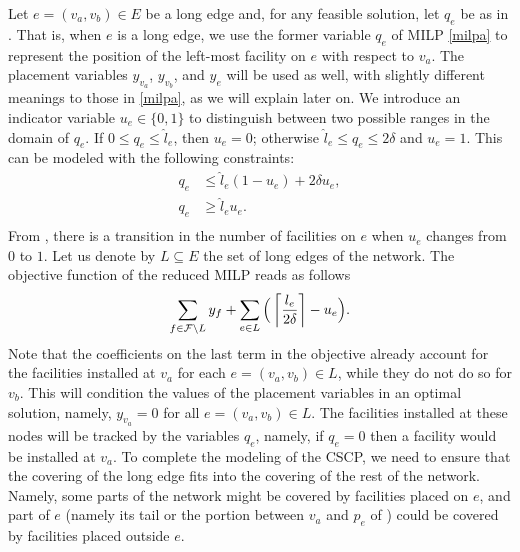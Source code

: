 Let $e=(v_a,v_b)\in E$ be a long edge and, for any feasible solution, let $q_e$ be as in . That is, when $e$ is a long edge, we use the former variable $q_e$ of MILP \eqref{milpa} to represent the position of the left-most facility on $e$ with respect to $v_a$. The placement variables $y_{v_a}$, $y_{v_b}$, and $y_e$ will be used as well, with slightly different meanings to those in \eqref{milpa}, as we will explain later on. We introduce an indicator variable $u_{e}\in\{0,1\}$ to distinguish between two possible ranges in the domain of $q_e$.  If $0 \le q_{e} \le \hat l_e$, then $u_{e} =0$; otherwise $\hat l_{e} \le q_{e} \le 2\delta$ and $u_{e} =1$.  This can be modeled with the following constraints:
\begin{equation}
\label{eq.cvu}
\begin{split}
	q_{e} &\le \hat l_e (1-u_{e})   +2\delta u_{e},\\
	q_{e} &\ge \hat l_e u_{e}. \\
\end{split}
\end{equation}
From ,  there is a  transition in the number of facilities on $e$ when $u_{e}$ changes from $0$ to $1$. Let us denote by $L\subseteq E$ the set of long edges of the network. The objective function of the reduced MILP reads as follows
\begin{equation}\label{obj-new}
	\sum_{f\in\mathcal F\setminus L} y_f + \sum_{e\in L} \Big(\left\lceil \frac{l_e}{2\delta}\right\rceil -u_e\Big).
\end{equation}
Note that the coefficients on the last term in the objective already account for the facilities installed at $v_a$ for each $e=(v_a,v_b)\in L$, while they do not do so for $v_b$. This will condition the values of the placement variables in an optimal solution, namely, $y_{v_a}=0$ for all $e=(v_a,v_b)\in L$. The facilities installed at these nodes will be tracked by the variables $q_e$, namely, if $q_e=0$ then a facility would be installed at $v_a$. To complete the modeling of the CSCP, we need to ensure that the covering of the long edge fits into the covering of the rest of the network. Namely, some parts of the network might be covered by facilities placed on $e$, and part of $e$ (namely its tail or the portion between $v_a$ and $p_e$ of ) could be covered by facilities placed outside $e$.

